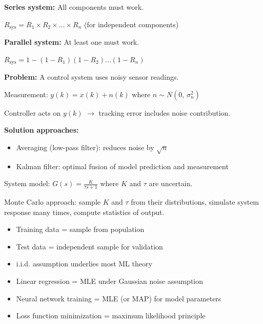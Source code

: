 \textbf{Series system:} All components must work.

$R_{\mathrm{sys}} = R_{1} \times R_{2} \times \ldots \times R_{n}$ (for independent components)

\textbf{Parallel system:} At least one must work.

$R_{\mathrm{sys}} = 1 - (1-R_{1})(1-R_{2})\ldots (1-R_{n})$



\textbf{Problem:} A control system uses noisy sensor readings.

Measurement: $y(k) = x(k) + n(k)$ where $n \sim N(0,\, \sigma^{2}_{n})$

Controller acts on $y(k)$ \ensuremath{\to} tracking error includes noise contribution.

\textbf{Solution approaches:}

\begin{itemize}
\tightlist
\item
  Averaging (low-pass filter): reduces noise by $\sqrt{n}$
\item
  Kalman filter: optimal fusion of model prediction and measurement
\end{itemize}


System model: $G(s) = \frac{K}{\tau s + 1}$ where $K$ and $\tau$ are uncertain.

Monte Carlo approach: sample $K$ and $\tau$ from their distributions, simulate system response many times, compute statistics of output.



\begin{itemize}
\tightlist
\item
  Training data = sample from population
\item
  Test data = independent sample for validation
\item
  i.i.d. assumption underlies most ML theory
\end{itemize}


\begin{itemize}
\tightlist
\item
  Linear regression = MLE under Gaussian noise assumption
\item
  Neural network training = MLE (or MAP) for model parameters
\item
  Loss function minimization = maximum likelihood principle
\end{itemize}

